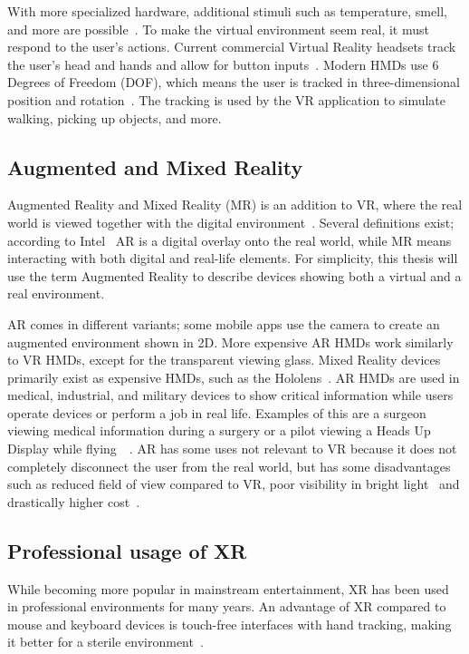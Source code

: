 \documentclass[a4paper]{report}
\begin{document}
With more specialized hardware, additional stimuli such as temperature, smell, and more are possible~\cite{noauthor_feelreal_nodate}.
To make the virtual environment seem real, it must respond to the user's actions. Current commercial Virtual Reality headsets track the user's head and hands and allow for button inputs~\cite{noauthor_oculus_nodate}. Modern HMDs use 6 Degrees of Freedom (DOF), which means the user is tracked in three-dimensional position and rotation~\cite{lang_introduction_2013}. The tracking is used by the VR application to simulate walking, picking up objects, and more.

\subsection{Augmented and Mixed Reality}
Augmented Reality and Mixed Reality (MR) is an addition to VR, where the real world is viewed together with the digital environment~\cite{hackett_three-dimensional_2016}. Several definitions exist; according to Intel~\cite{intel_virtual_nodate} AR is a digital overlay onto the real world, while MR means interacting with both digital and real-life elements.
For simplicity, this thesis will use the term Augmented Reality to describe devices showing both a virtual and a real environment.

AR comes in different variants; some mobile apps use the camera to create an augmented environment shown in 2D. More expensive AR HMDs work similarly to VR HMDs, except for the transparent viewing glass. Mixed Reality devices primarily exist as expensive HMDs, such as the Hololens~\cite{hololens_microsoft_nodate}.
AR HMDs are used in medical, industrial, and military devices to show critical information while users operate devices or perform a job in real life. Examples of this are a surgeon viewing medical information during a surgery or a pilot viewing a Heads Up Display while flying~\cite{mihelj_virtual_2014}~\cite{mertz_virtual_2019}.
AR has some uses not relevant to VR because it does not completely disconnect the user from the real world, but has some disadvantages such as reduced field of view compared to VR, poor visibility in bright light~\cite{hackett_three-dimensional_2016} and drastically higher cost~\cite{medical_holodeck_medicalholodeck_nodate}.

\subsection{Professional usage of XR}
While becoming more popular in mainstream entertainment, XR has been used in professional environments for many years.
An advantage of XR compared to mouse and keyboard devices is touch-free interfaces with hand tracking, making it better for a sterile environment~\cite{andrews_extended_2019}.
\end{document}
